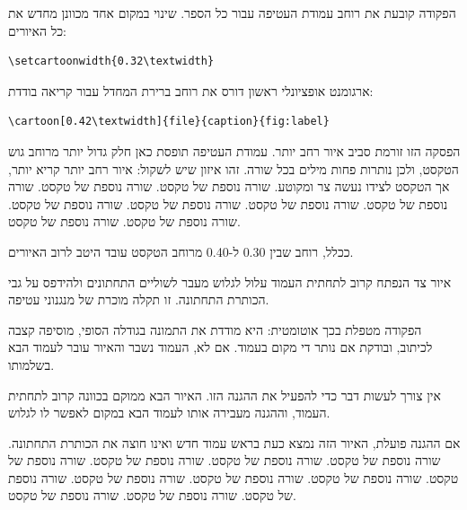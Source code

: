 \documentclass{hebrew-academic-template}
\begin{document}

הפקודה  קובעת את רוחב עמודת העטיפה עבור כל
הספר. שינוי במקום אחד מכוונן מחדש את כל האיורים:

\begin{english}
\begin{verbatim}
\setcartoonwidth{0.32\textwidth}
\end{verbatim}
\end{english}


ארגומנט אופציונלי ראשון דורס את רוחב ברירת המחדל עבור קריאה בודדת:

\begin{english}
\begin{verbatim}
\cartoon[0.42\textwidth]{file}{caption}{fig:label}
\end{verbatim}
\end{english}

הפסקה הזו זורמת סביב איור רחב יותר. עמודת העטיפה תופסת כאן חלק גדול יותר
מרוחב גוש הטקסט, ולכן נותרות פחות מילים בכל שורה. זהו איזון שיש לשקול: איור
רחב יותר קריא יותר, אך הטקסט לצידו נעשה צר ומקוטע. שורה נוספת של טקסט. שורה
נוספת של טקסט. שורה נוספת של טקסט. שורה נוספת של טקסט. שורה נוספת של טקסט.
שורה נוספת של טקסט. שורה נוספת של טקסט. שורה נוספת של טקסט.

ככלל, רוחב שבין \num{0.30} ל-\num{0.40} מרוחב הטקסט עובד היטב לרוב האיורים.



איור צד הנפתח קרוב לתחתית העמוד עלול לגלוש מעבר לשוליים התחתונים ולהידפס על
גבי הכותרת התחתונה. זו תקלה מוכרת של מנגנוני עטיפה.

הפקודה  מטפלת בכך אוטומטית: היא מודדת את התמונה
בגודלה הסופי, מוסיפה קצבה לכיתוב, ובודקת אם נותר די מקום בעמוד. אם לא, העמוד
נשבר והאיור עובר לעמוד הבא בשלמותו.

אין צורך לעשות דבר כדי להפעיל את ההגנה הזו. האיור הבא ממוקם בכוונה קרוב
לתחתית העמוד, וההגנה מעבירה אותו לעמוד הבא במקום לאפשר לו לגלוש.

אם ההגנה פועלת, האיור הזה נמצא כעת בראש עמוד חדש ואינו חוצה את הכותרת
התחתונה. שורה נוספת של טקסט. שורה נוספת של טקסט. שורה נוספת של טקסט. שורה
נוספת של טקסט. שורה נוספת של טקסט. שורה נוספת של טקסט. שורה נוספת של טקסט.
שורה נוספת של טקסט. שורה נוספת של טקסט. שורה נוספת של טקסט.
\end{document}
